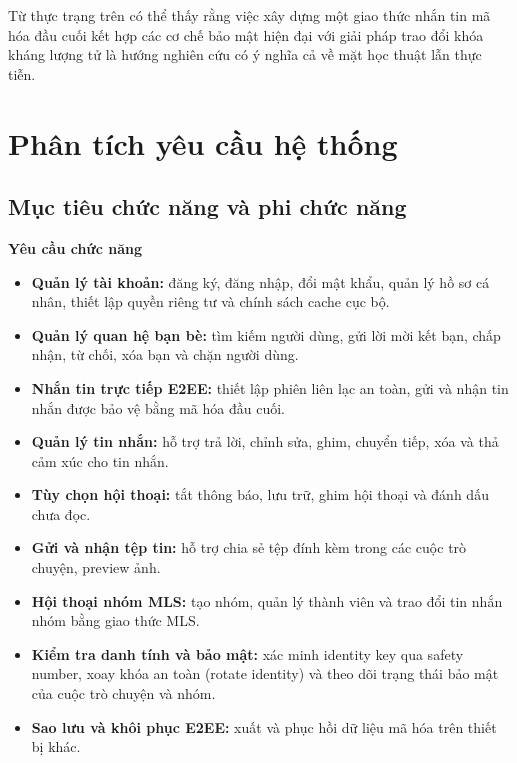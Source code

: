 Từ thực trạng trên có thể thấy rằng việc xây dựng một giao thức nhắn tin mã hóa đầu cuối kết hợp các cơ chế bảo mật hiện đại với giải pháp trao đổi khóa kháng lượng tử là hướng nghiên cứu có ý nghĩa cả về mặt học thuật lẫn thực tiễn.

\section{Phân tích yêu cầu hệ thống}

\subsection{Mục tiêu chức năng và phi chức năng}

\textbf{Yêu cầu chức năng}

\begin{itemize}
    \item \textbf{Quản lý tài khoản:} đăng ký, đăng nhập, đổi mật khẩu, quản lý hồ sơ cá nhân, thiết lập quyền riêng tư và chính sách cache cục bộ.

    \item \textbf{Quản lý quan hệ bạn bè:} tìm kiếm người dùng, gửi lời mời kết bạn, chấp nhận, từ chối, xóa bạn và chặn người dùng.

    \item \textbf{Nhắn tin trực tiếp E2EE:} thiết lập phiên liên lạc an toàn, gửi và nhận tin nhắn được bảo vệ bằng mã hóa đầu cuối.

    \item \textbf{Quản lý tin nhắn:} hỗ trợ trả lời, chỉnh sửa, ghim, chuyển tiếp, xóa và thả cảm xúc cho tin nhắn.

    \item \textbf{Tùy chọn hội thoại:} tắt thông báo, lưu trữ, ghim hội thoại và đánh dấu chưa đọc.

    \item \textbf{Gửi và nhận tệp tin:} hỗ trợ chia sẻ tệp đính kèm trong các cuộc trò chuyện, preview ảnh.

    \item \textbf{Hội thoại nhóm MLS:} tạo nhóm, quản lý thành viên và trao đổi tin nhắn nhóm bằng giao thức MLS.

    \item \textbf{Kiểm tra danh tính và bảo mật:} xác minh identity key qua safety number, xoay khóa an toàn (rotate identity) và theo dõi trạng thái bảo mật của cuộc trò chuyện và nhóm.

    \item \textbf{Sao lưu và khôi phục E2EE:} xuất và phục hồi dữ liệu mã hóa trên thiết bị khác.

\end{itemize}

